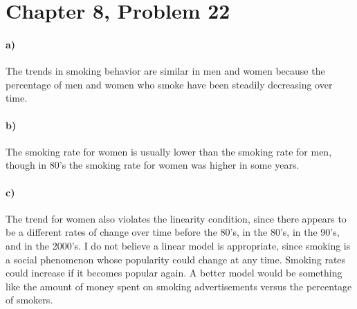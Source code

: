 \documentclass[12pt]{article}
\begin{document}
\section*{Chapter 8, Problem 22}

\paragraph{a)}

The trends in smoking behavior are similar in men and women because the percentage of men and women who
smoke have been steadily decreasing over time.

\paragraph{b)}

The smoking rate for women is usually lower than the smoking rate for men, though in 80's the smoking rate
for women was higher in some years.

\paragraph{c)}

The trend for women also violates the linearity condition, since there appears to be a different rates
of change over time before the 80's, in the 80's, in the 90's, and in the 2000's. I do not believe a linear
model is appropriate, since smoking is a social phenomenon whose popularity could change at any time.
Smoking rates could increase if it becomes popular again. A better model would be something like
the amount of money spent on smoking advertisements versus the percentage of smokers.
\end{document}
